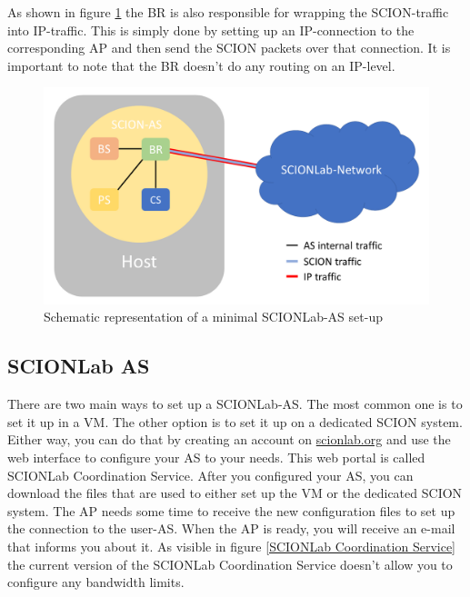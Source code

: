 As shown in figure \ref{SCIONLab-AS} the \acl{BR} is also responsible for wrapping the \acs{SCION}-traffic into \acs{IP}-traffic. This is simply done by setting up an \acs{IP}-connection to the corresponding \acl{AP} and then send the \acs{SCION} packets over that connection. It is important to note that the \acl{BR} doesn't do any routing on an \acs{IP}-level.

\begin{figure}[h]
	\centering
	\includegraphics[width=\textwidth]{img/SCIONLab-AS.png}
	\caption{Schematic representation of a minimal SCIONLab-AS set-up}
	\label{SCIONLab-AS}
\end{figure}

\newpage

\subsection{SCIONLab AS}
There are two main ways to set up a \acs{SCIONLab}-\acs{AS}. The most common one is to set it up in a \acs{VM}. The other option is to set it up on a dedicated \acs{SCION} system. Either way, you can do that by creating an account on \href{https://www.scionlab.org}{scionlab.org} and use the web interface to configure your \acs{AS} to your needs. This web portal is called \acs{SCIONLab} Coordination Service. After you configured your \acs{AS}, you can download the files that are used to either set up the \acs{VM} or the dedicated \acs{SCION} system. The \acl{AP} needs some time to receive the new configuration files to set up the connection to the user-\acs{AS}. When the \acs{AP} is ready, you will receive an e-mail that informs you about it. As visible in figure \ref{SCIONLab Coordination Service} the current version of the \acs{SCIONLab} Coordination Service doesn't allow you to configure any bandwidth limits.

